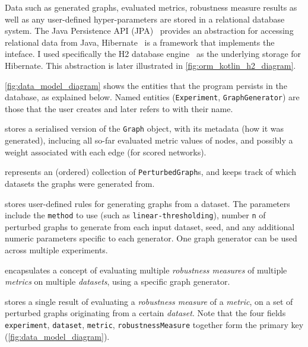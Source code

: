 Data such as generated graphs, evaluated metrics, robustness measure results as well as any user-defined hyper-parameters are stored in a relational database system.
The Java Persistence API (JPA)~\cite{BiswasJavaPersistenceAPI2016} provides an abstraction for accessing relational data from Java, Hibernate~\cite{ElliottHibernateDeveloperNotebook2004,BauerJavaPersistenceHibernate2015} is a framework that implements the inteface.
I used specifically the H2 database engine~\cite{MuellerH2DatabaseEngine2006} as the underlying storage for Hibernate.
This abstraction is later illustrated in \autoref{fig:orm_kotlin_h2_diagram}.



\autoref{fig:data_model_diagram} shows the entities that the program persists in the database, as explained below.
Named entities (\texttt{Experiment}, \texttt{GraphGenerator}) are those that the user creates and later refers to with their name.
\begin{description}[itemsep=\zerospace]
    \item[\texttt{PerturbedGraph}]
    stores a serialised version of the \texttt{Graph} object, with its metadata (how it was generated), inclucing all so-far evaluated metric values of nodes, and possibly a weight associated with each edge (for scored networks).

    \item[\texttt{GraphCollection}]
    represents an (ordered) collection of \texttt{PerturbedGraph}s, and keeps track of which datasets the graphs were generated from.

    \item[\texttt{GraphGenerator}]
    stores user-defined rules for generating graphs from a dataset.
    The parameters include the \texttt{method} to use (such as \texttt{linear-thresholding}), number \texttt{n} of perturbed graphs to generate from each input dataset, seed, and any additional numeric parameters specific to each generator.
    One graph generator can be used across multiple experiments.

    \item[\texttt{Experiment}]
    encapsulates a concept of evaluating multiple \textsl{robustness measures} of multiple \textsl{metrics} on multiple \textsl{datasets}, using a specific graph generator.

    \item[\texttt{Robustness}]
    stores a single result of evaluating a \textsl{robustness measure} of a \textsl{metric}, on a set of perturbed graphs originating from a certain \textsl{dataset}.
    Note that the four fields \texttt{experiment}, \texttt{dataset}, \texttt{metric}, \texttt{robustnessMeasure} together form the primary key (\autoref{fig:data_model_diagram}).
\end{description}

